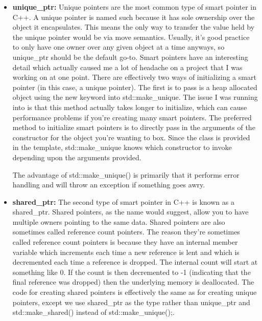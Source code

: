 \documentclass{article}
\begin{document}
\begin{itemize}

\item{%
    \textbf{unique\_ptr:} Unique pointers are the most common type of smart pointer in C++. A unique pointer
    is named such because it has sole ownership over the object it encapsulates. This means the only way to
    transfer the value held by the unique pointer would be via move semantics. Usually, it's good practice to
    only have one owner over any given object at a time anyways, so unique\_ptr should be the default go-to.
    Smart pointers have an interesting detail which actually caused me a lot of headache on a project that I
    was working on at one point. There are effectively two ways of initializing a smart pointer (in this case,
    a unique pointer). The first is to pass is a heap allocated object using the new keyword into
    std::make\_unique. The issue I was running into is that this method actually takes longer to initialize,
    which can cause performance problems if you're creating many smart pointers. The preferred method to
    initialize smart pointers is to directly pass in the arguments of the constructor for the object you're
    wanting to box. Since the class is provided in the template, std::make\_unique knows which constructor
    to invoke depending upon the arguments provided.




    The advantage of std::make\_unique() is primarily that it performs error handling and will throw an
    exception if something goes awry.
}

\item{%
    \textbf{shared\_ptr:} The second type of smart pointer in C++ is known as a shared\_ptr. Shared pointers,
    as the name would suggest, allow you to have multiple owners pointing to the same data. Shared pointers
    are also sometimes called reference count pointers. The reason they're sometimes called reference count
    pointers is because they have an internal member variable which increments each time a new reference is
    lent and which is decremented each time a reference is dropped. The internal count will start at something
    like 0. If the count is then decremented to -1 (indicating that the final reference was dropped) then the
    underlying memory is deallocated. The code for creating shared pointers is effectively the same as for
    creating unique pointers, except we use shared\_ptr as the type rather than unique\_ptr and
    std::make\_shared() instead of std::make\_unique();.

}
\end{itemize}
\end{document}
